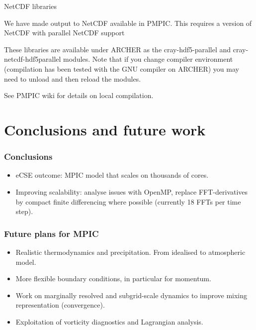 \documentclass{beamer}
\def\oran#1{\color{orange} #1}
\def\re#1{\color{red}   #1}
\def\bl#1{\color{blue}  #1}
\def\pu#1{\color{purple} #1}
\begin{document}
\begin{frame}[fragile]{NetCDF libraries}
\protect\hypertarget{netcdf-libraries}{}

We have made output to NetCDF available in PMPIC. This requires a
version of NetCDF with parallel NetCDF support

These libraries are available under ARCHER as the cray-hdf5-parallel and
cray-netcdf-hdf5parallel modules. Note that if you change compiler
environment (compilation has been tested with the GNU compiler on
ARCHER) you may need to unload and then reload the modules.

See PMPIC wiki for details on local compilation.

\end{frame}
 
\section{Conclusions and future work}

\begin{frame}
\frametitle{Conclusions}

\begin{itemize}
\item eCSE outcome: MPIC model that scales on thousands of cores.
\item Improving scalability: analyse issues with OpenMP, replace FFT-derivatives by compact finite differencing where possible (currently 18 FFTs per time step).  
\end{itemize}

\end{frame}


\begin{frame}
\frametitle{Future plans for MPIC}

\vspace{0.2cm}
\begin{itemize}
\item Realistic {\bl thermodynamics} and {\bl precipitation}. From idealised to atmospheric model.
\item More flexible {\pu boundary conditions}, in particular for momentum.
\item Work on {\re marginally resolved and subgrid-scale dynamics} to improve mixing representation (convergence).
\item Exploitation of {\oran vorticity diagnostics} and {\oran Lagrangian analysis}. 
\end{itemize}

\centering

\end{frame}

\end{document}
